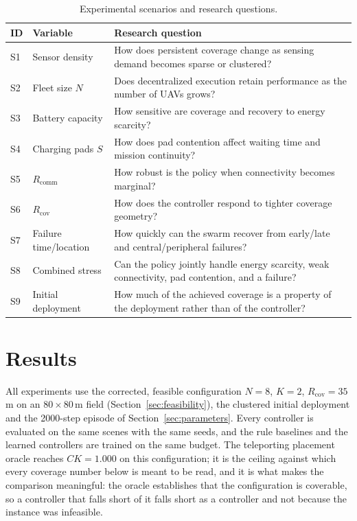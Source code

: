 \documentclass[conference]{IEEEtran}
\begin{document}
\begin{table}[t]
\caption{Experimental scenarios and research questions.}
\label{tab:scenarios}
\centering
\scriptsize
\renewcommand{\arraystretch}{1.06}
\begin{tabularx}{\columnwidth}{@{}L{0.65cm}L{1.75cm}Y@{}}
\toprule
ID & Variable & Research question \\
\midrule
S1 & Sensor density & How does persistent coverage change as sensing demand becomes sparse or clustered? \\
S2 & Fleet size $N$ & Does decentralized execution retain performance as the number of UAVs grows? \\
S3 & Battery capacity & How sensitive are coverage and recovery to energy scarcity? \\
S4 & Charging pads $S$ & How does pad contention affect waiting time and mission continuity? \\
S5 & $R_{\mathrm{comm}}$ & How robust is the policy when connectivity becomes marginal? \\
S6 & $R_{\mathrm{cov}}$ & How does the controller respond to tighter coverage geometry? \\
S7 & Failure time/location & How quickly can the swarm recover from early/late and central/peripheral failures? \\
S8 & Combined stress & Can the policy jointly handle energy scarcity, weak connectivity, pad contention, and a failure? \\
S9 & Initial deployment & How much of the achieved coverage is a property of the deployment rather than of the controller? \\
\bottomrule
\end{tabularx}
\end{table}

\section{Results}
\label{sec:results}

All experiments use the corrected, feasible configuration $N=8$, $K=2$,
$R_{\mathrm{cov}}=35$\,m on an $80\times80$\,m field
(Section~\ref{sec:feasibility}), the clustered initial deployment and the
2000-step episode of Section~\ref{sec:parameters}.  Every controller is
evaluated on the same scenes with the same seeds, and the rule baselines and
the learned controllers are trained on the same budget.  The teleporting
placement oracle reaches $CK=1.000$ on this configuration; it is the
ceiling against which every coverage number below is meant to be read, and
it is what makes the comparison meaningful: the oracle establishes that
the configuration is coverable, so a controller that falls short of it
falls short as a controller and not because the instance was infeasible.
\end{document}
